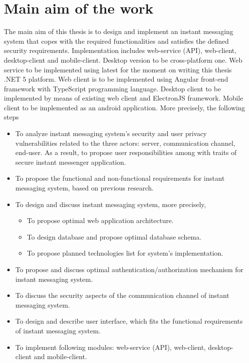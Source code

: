 \chapter{Main aim of the work}\label{ch:main-aim-of-the-work}

The main aim of this thesis is to design and implement an instant messaging system
that copes with the required functionalities and satisfies the defined security requirements.
Implementation includes web-service (API), web-client, desktop-client and mobile-client.
Desktop version to be cross-platform one.
Web service to be implemented using latest for the moment on writing this thesis .NET 5 platform.
Web client is to be implemented using Angular front-end framework with TypeScript programming language.
Desktop client to be implemented by means of existing web client and ElectronJS framework.
Mobile client to be implemented as an android application.
More precisely, the following steps
\begin{itemize}
    \item To analyze instant messaging system's security and user privacy vulnerabilities related to the three
    actors: server, communication channel, end-user.
    As a result, to propose user responsibilities among with traits of secure instant messenger application.
    \item To propose the functional and non-functional requirements for instant messaging system, based on previous
    research.
    \item To design and discuss instant messaging system, more precisely,
    \begin{itemize}
        \item To propose optimal web application architecture.
        \item To design database and propose optimal database schema.
        \item To propose planned technologies list for system's implementation.
    \end{itemize}
    \item To propose and discuss optimal authentication/authorization mechanism for instant messaging system.
    \item To discuss the security aspects of the communication channel of instant messaging system.
    \item To design and describe user interface, which fits the functional requirements of instant messaging system.
    \item To implement following modules: web-service (API), web-client, desktop-client and mobile-client.
\end{itemize}
